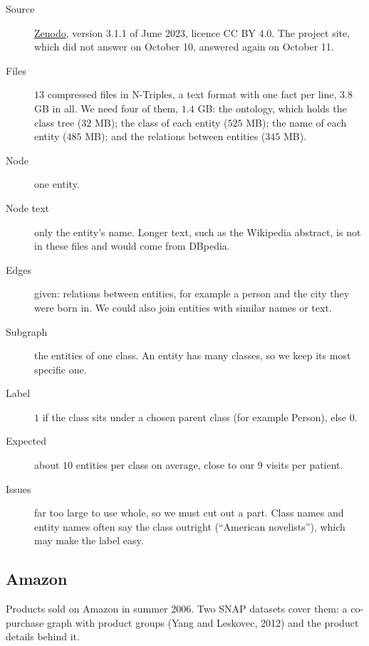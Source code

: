 \documentclass[11pt]{article}
\begin{document}
\begin{description}
\item[Source] \href{https://doi.org/10.5281/zenodo.8068322}{Zenodo}, version 3.1.1 of June 2023,
licence CC BY 4.0. The project site, which did not answer on October 10, answered again on
October 11.
\item[Files] $13$ compressed files in N-Triples, a text format with one fact per line, $3.8$ GB
in all. We need four of them, $1.4$ GB: the ontology, which holds the class tree ($32$ MB); the
class of each entity ($525$ MB); the name of each entity ($485$ MB); and the relations between
entities ($345$ MB).
\item[Node] one entity.
\item[Node text] only the entity's name. Longer text, such as the Wikipedia abstract, is not in
these files and would come from DBpedia.
\item[Edges] given: relations between entities, for example a person and the city they were
born in. We could also join entities with similar names or text.
\item[Subgraph] the entities of one class. An entity has many classes, so we keep its most
specific one.
\item[Label] $1$ if the class sits under a chosen parent class (for example Person), else $0$.
\item[Expected] about $10$ entities per class on average, close to our $9$ visits per patient.
\item[Issues] far too large to use whole, so we must cut out a part. Class names and entity names
often say the class outright (``American novelists''), which may make the label easy.
\end{description}

\subsection*{Amazon}

Products sold on Amazon in summer 2006. Two SNAP datasets cover them: a co-purchase graph with
product groups (Yang and Leskovec, 2012) and the product details behind it.
\end{document}
